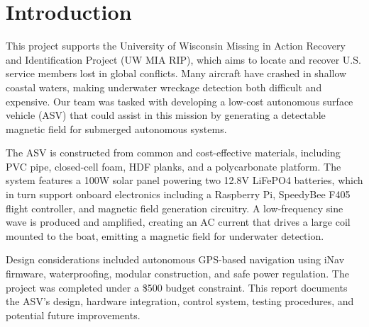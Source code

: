 \section{Introduction}

This project supports the University of Wisconsin Missing in Action Recovery and Identification Project (UW MIA RIP), which aims to locate and recover U.S. service members lost in global conflicts. Many aircraft have crashed in shallow coastal waters, making underwater wreckage detection both difficult and expensive. Our team was tasked with developing a low-cost autonomous surface vehicle (ASV) that could assist in this mission by generating a detectable magnetic field for submerged autonomous systems.

The ASV is constructed from common and cost-effective materials, including PVC pipe, closed-cell foam, HDF planks, and a polycarbonate platform. The system features a 100W solar panel powering two 12.8V LiFePO4 batteries, which in turn support onboard electronics including a Raspberry Pi, SpeedyBee F405 flight controller, and magnetic field generation circuitry. A low-frequency sine wave is produced and amplified, creating an AC current that drives a large coil mounted to the boat, emitting a magnetic field for underwater detection.

Design considerations included autonomous GPS-based navigation using iNav firmware, waterproofing, modular construction, and safe power regulation. The project was completed under a \$500 budget constraint. This report documents the ASV's design, hardware integration, control system, testing procedures, and potential future improvements.